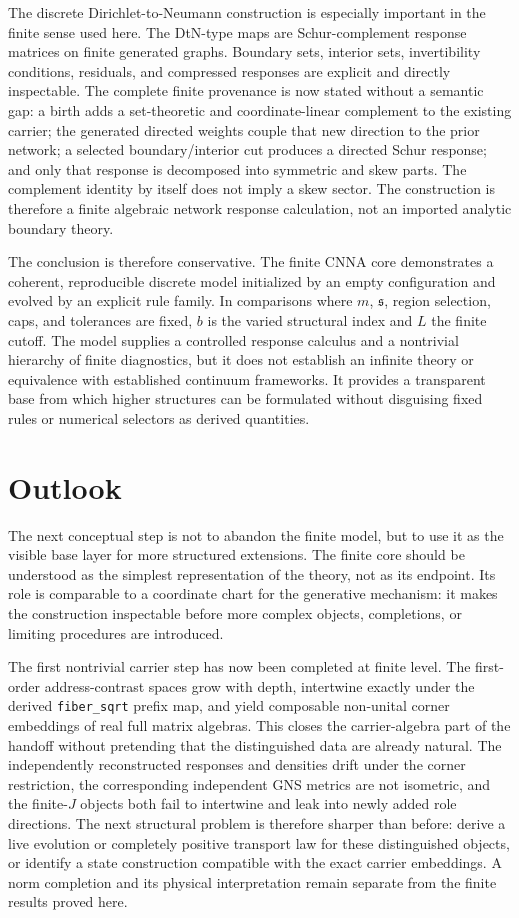 \documentclass[11pt]{article}
\theoremstyle{remark}
\newcommand{\code}[1]{\texttt{#1}}
\numberwithin{equation}{section}
\begin{document}
The discrete Dirichlet-to-Neumann construction is especially important in the finite sense used here. The DtN-type maps are Schur-complement response matrices on finite generated graphs. Boundary sets, interior sets, invertibility conditions, residuals, and compressed responses are explicit and directly inspectable. The complete finite provenance is now stated without a semantic gap: a birth adds a set-theoretic and coordinate-linear complement to the existing carrier; the generated directed weights couple that new direction to the prior network; a selected boundary/interior cut produces a directed Schur response; and only that response is decomposed into symmetric and skew parts. The complement identity by itself does not imply a skew sector. The construction is therefore a finite algebraic network response calculation, not an imported analytic boundary theory.

The conclusion is therefore conservative. The finite CNNA core demonstrates a coherent, reproducible discrete model initialized by an empty configuration and evolved by an explicit rule family. In comparisons where \(m\), \(\mathfrak{s}\), region selection, caps, and tolerances are fixed, \(b\) is the varied structural index and \(L\) the finite cutoff. The model supplies a controlled response calculus and a nontrivial hierarchy of finite diagnostics, but it does not establish an infinite theory or equivalence with established continuum frameworks. It provides a transparent base from which higher structures can be formulated without disguising fixed rules or numerical selectors as derived quantities.

\section{Outlook}
The next conceptual step is not to abandon the finite model, but to use it as the visible base layer for more structured extensions. The finite core should be understood as the simplest representation of the theory, not as its endpoint. Its role is comparable to a coordinate chart for the generative mechanism: it makes the construction inspectable before more complex objects, completions, or limiting procedures are introduced.

The first nontrivial carrier step has now been completed at finite level. The first-order address-contrast spaces grow with depth, intertwine exactly under the derived \code{fiber\_sqrt} prefix map, and yield composable non-unital corner embeddings of real full matrix algebras. This closes the carrier-algebra part of the handoff without pretending that the distinguished data are already natural. The independently reconstructed responses and densities drift under the corner restriction, the corresponding independent GNS metrics are not isometric, and the finite-\(J\) objects both fail to intertwine and leak into newly added role directions. The next structural problem is therefore sharper than before: derive a live evolution or completely positive transport law for these distinguished objects, or identify a state construction compatible with the exact carrier embeddings. A norm completion and its physical interpretation remain separate from the finite results proved here.
\end{document}
